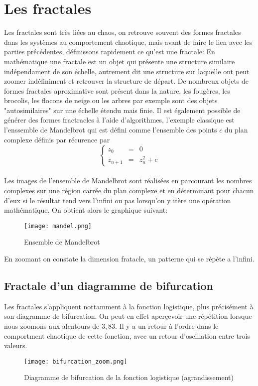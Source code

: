 \chapter{Les fractales}
\label{chapter:fractales}
Les fractales sont très liées au chaos, on retrouve souvent des formes fractales dans les systèmes au comportement chaotique, mais avant de faire le lien avec les parties précédentes, définissons rapidement ce qu'est une fractale: En mathématique une fractale est un objet qui présente une structure similaire indépendament de son échelle, autrement dit une structure sur laquelle ont peut zoomer indéfiniment et retrouver la structure de départ. De nombreux objets de formes fractales aproximative sont présent dans la nature, les fougères, les brocolis, les flocons de neige ou les arbres par exemple sont des objets "autosimilaires" sur une échelle étendu mais finie. Il est également possible de générer des formes fractracles à l'aide d'algorithmes, l'exemple classique est l'enssemble de Mandelbrot qui est défini comme l'ensemble des points $c$ du plan complexe définis par récurence par
\[
    \left\{
    \begin{array}{rcl}
        z_0&=&0\\
        z_{n+1}&=&z_{n}^2+c
    \end{array}
    \right.
\]\\
Les images de l'ensemble de Mandelbrot sont réalisées en parcourant les nombres complexes sur une région carrée du plan complexe et en déterminant pour chacun d'eux si le résultat tend vers l'infini ou pas lorsqu'on y itère une opération mathématique. On obtient alors le graphique suivant:

\begin{figure}[!ht]
    \centering
    \texttt{[image: mandel.png]}
    \caption{\label{fig:mandel} Ensemble de Mandelbrot} 
\end{figure}

En zoomant on constate la dimension fratacle, un patterne qui se répète a l'infini.

\section{Fractale d'un diagramme de bifurcation}
Les fractales s'appliquent nottamment à la fonction logistique, plus précisément à son diagramme de bifurcation. On peut en effet aperçevoir une répétition lorsque nous zoomons aux alentours de $3,83$. Il y a un retour à l'ordre dans le comportment chaotique de cette fonction, avec un retour d'oscillation entre trois valeurs.
\begin{figure}[!ht]
    \begin{center}
        \texttt{[image: bifurcation\_zoom.png]}
    \end{center}
    \caption{\label{fig:bifurcation_zoom}Diagramme de bifurcation de la fonction logistique (agrandissement)}
\end{figure}

